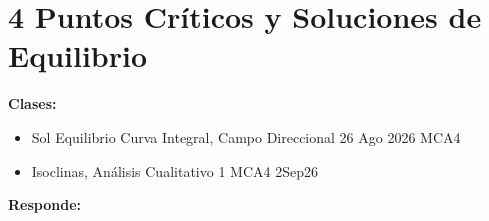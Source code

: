 \section{4 Puntos Críticos y Soluciones de Equilibrio}

\begin{tcolorbox}[enunciado]
\textbf{Clases:}
\begin{itemize}[leftmargin=*]
    \item Sol Equilibrio Curva Integral, Campo Direccional 26 Ago 2026 MCA4
    \item Isoclinas, Análisis Cualitativo 1 MCA4 2Sep26
\end{itemize}
\end{tcolorbox}

\vspace{0.3cm}
\textbf{Responde:}

